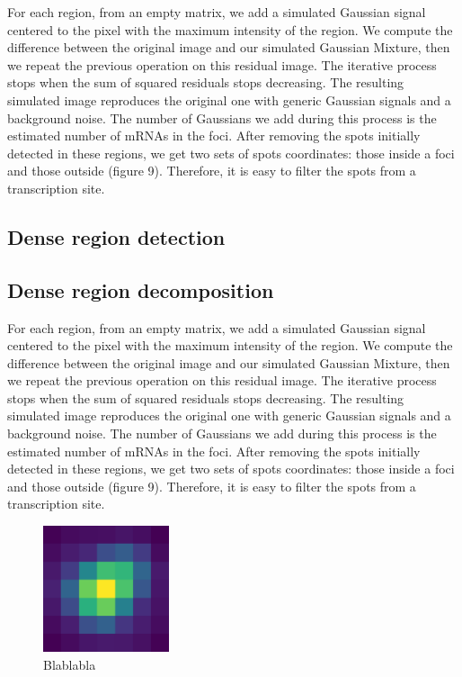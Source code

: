 For each region, from an empty matrix, we add a simulated Gaussian signal centered
to the pixel with the maximum intensity of the region. We compute the difference
between the original image and our simulated Gaussian Mixture, then we repeat the
previous operation on this residual image. The iterative process stops when the
sum of squared residuals stops decreasing. The resulting simulated image reproduces
the original one with generic Gaussian signals and a background noise. The number
of Gaussians we add during this process is the estimated number of mRNAs in the
foci. After removing the spots initially detected in these regions, we get two
sets of spots coordinates: those inside a foci and those outside (figure 9).
Therefore, it is easy to filter the spots from a transcription site.

\subsection{Dense region detection}

\subsection{Dense region decomposition}

For each region, from an empty matrix, we add a simulated Gaussian signal centered
to the pixel with the maximum intensity of the region. We compute the difference
between the original image and our simulated Gaussian Mixture, then we repeat the
previous operation on this residual image. The iterative process stops when the
sum of squared residuals stops decreasing. The resulting simulated image reproduces
the original one with generic Gaussian signals and a background noise. The number
of Gaussians we add during this process is the estimated number of mRNAs in the
foci. After removing the spots initially detected in these regions, we get two
sets of spots coordinates: those inside a foci and those outside (figure 9).
Therefore, it is easy to filter the spots from a transcription site.


\begin{figure}
  \begin{center}
    \includegraphics[width=0.33\textwidth]{figures/chapter2/reference_spot}
  \end{center}
  \caption{Blablabla}
  \label{fig:reference_spot}
\end{figure}


